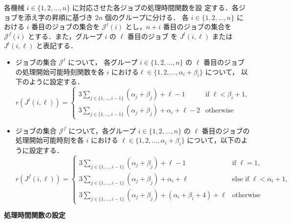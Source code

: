 \documentclass[12pt]{optlab-bachelor}
\begin{document}
各機械 $i \in \{1,2,\ldots,n\}$ に対応させた各ジョブの処理時間関数を設
定する．各ジョブを添え字の昇順に基づき $2n$ 個のグループに分ける． 各 $i
\in \{1,2,\ldots,n\}$ における $i$ 番目のジョブの集合を
$\mathcal{J}^t(i)$ とし，$n + i$ 番目のジョブの集合を
$\mathcal{J}^f(i)$ とする．また，グループ $i$ の $\ell$ 番目のジョブ
を $J^t(i,\ell)$ または $J^t(i,\ell)$ と表記する．
\begin{itemize}
\item ジョブの集合 $\mathcal{J}^t$ について， 各グループ $i \in
  \{1,2,\ldots, n\}$ の $\ell$ 番目のジョブの処理開始可能時刻関数を各
  $i$ における$\ell \in \{1,2,\ldots, \alpha_i + \beta_i\}$ について，
  以下のように設定する．
  $$r(J^t(i,\ell)) =
  \left\{ \begin{array}{lll} 3 \displaystyle
  \sum_{j \in \{1,\ldots,i - 1\}}(\alpha_j + \beta_j) + \ell - 1 &
  \text{if } \ell < \beta_i + 1, \\ 3 \displaystyle \sum_{j \in \{1,\ldots,i - 1\}}(\alpha_j + \beta_j) + \alpha_i + \ell - 2 & \text{otherwise} \end{array} \right.$$
                 
\item ジョブの集合 $\mathcal{J}^f$ について，各グループ $i \in \{1,2,\ldots, n\}$ の $\ell$ 番目のジョブの処理開始可能時刻を各 $i$ における $\ell \in \{1,2,\ldots,\alpha_i + \beta_i\}$ について，以下のように設定する．
  $$r(J^f(i,\ell)) =
  \left\{ \begin{array}{lll} 3 \displaystyle \sum_{j \in \{1,\ldots,i
            - 1\}}(\alpha_j + \beta_j) + \ell - 1 & \text{if } \ell = 1,
  \\ 3\displaystyle \sum_{j \in \{1,\ldots,i - 1\}}(\alpha_j + \beta_j) + \alpha_i + \ell  &
  \text{else if } \ell < \alpha_i + 1 , \\ 3\displaystyle \sum_{j \in \{1,\ldots,i - 1\}}(\alpha_j + \beta_j) + (\alpha_i + \beta_i + 4) + \ell & \text{otherwise} \end{array} \right.$$
\end{itemize}

\noindent \textbf{処理時間関数の設定}
\end{document}
